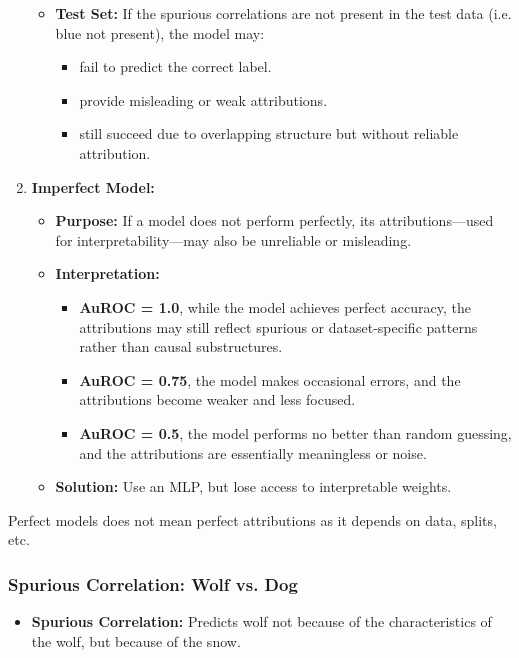 \begin{example}
\begin{enumerate}
\begin{itemize}
            \item \textbf{Test Set:} If the spurious correlations are not present in the test data (i.e. blue not present), the model may:
            \begin{itemize}
                \item fail to predict the correct label.
                \item provide misleading or weak attributions.
                \item still succeed due to overlapping structure but without reliable attribution.
            \end{itemize}
        \end{itemize}
        \item \textbf{Imperfect Model:}
        \begin{itemize}
            \item \textbf{Purpose:} If a model does not perform perfectly, its attributions—used for interpretability—may also be unreliable or misleading.        
            \item \textbf{Interpretation:}
            \begin{itemize}
                \item \textbf{AuROC = 1.0}, while the model achieves perfect accuracy, the attributions may still reflect spurious or dataset-specific patterns rather than causal substructures.
                \item \textbf{AuROC = 0.75}, the model makes occasional errors, and the attributions become weaker and less focused.
                \item \textbf{AuROC = 0.5}, the model performs no better than random guessing, and the attributions are essentially meaningless or noise.
            \end{itemize}
            \item \textbf{Solution:} Use an MLP, but lose access to interpretable weights. 
        \end{itemize}        
    \end{enumerate}
\end{example}

\begin{warning}
    Perfect models does not mean perfect attributions as it depends on data, splits, etc. 
\end{warning}
\newpage

\subsubsection{Spurious Correlation: Wolf vs. Dog}
\begin{example}
    \begin{itemize}
        \item \textbf{Spurious Correlation:} Predicts wolf not because of the characteristics of the wolf, but because of the snow.
    \end{itemize}
\end{example}
